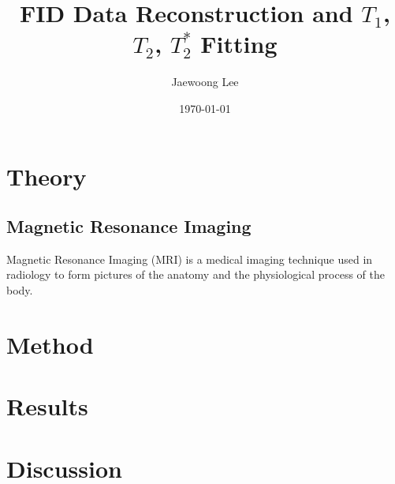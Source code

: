 \documentclass[10pt, a4paper]{article}
\title{FID Data Reconstruction and $T_1$, $T_2$, $T_2^{*}$ Fitting}
\author{Jaewoong Lee}
\date{\today}
\begin{document}
    \maketitle
	\newpage
	
	\tableofcontents
	\listoftables
	\listoffigures
	\newpage
	
	\section{Theory}
		\subsection{Magnetic Resonance Imaging}
			Magnetic Resonance Imaging (MRI) is a medical imaging technique used in radiology to form pictures of the anatomy and the physiological process of the body. 
	
	\section{Method}
	
	\section{Results}
	
	\section{Discussion}
	
	
	
\end{document}
